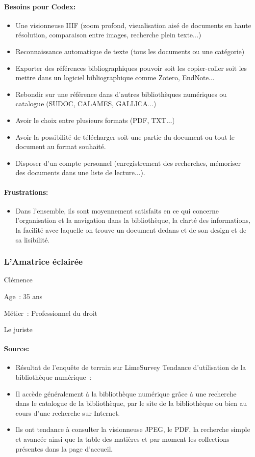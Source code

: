 \paragraph*{Besoins pour Codex:}
\begin{itemize}
	\item Une visionneuse IIIF (zoom profond, visualisation aisé de documents en haute résolution, comparaison entre images, recherche plein texte...)
\item Reconnaissance automatique de texte (tous les documents ou une catégorie)
\item Exporter des références bibliographiques pouvoir soit les copier-coller soit les mettre dans un logiciel bibliographique comme Zotero, EndNote...
\item Rebondir sur une référence dans d'autres bibliothèques numériques ou catalogue (SUDOC, CALAMES, GALLICA...)
\item Avoir le choix entre plusieurs formats (PDF, TXT...)
\item Avoir la possibilité de télécharger soit une partie du document ou tout le document au format souhaité.
\item Disposer d'un compte personnel (enregistrement des recherches, mémoriser des documents dans une liste de lecture...).
\end{itemize}
\paragraph*{Frustrations:}
\begin{itemize}
	\item Dans l’ensemble, ils sont moyennement satisfaits en ce qui concerne l’organisation et la navigation dans la bibliothèque, la clarté des informations, la facilité avec laquelle on trouve un document dedans et de son design et de sa lisibilité.
\end{itemize}

\subsubsection*{L’Amatrice éclairée}
Clémence 

Age : 35 ans

Métier : Professionnel du droit

Le juriste

\paragraph*{Source:}
\begin{itemize}
	\item Résultat de l’enquête de terrain sur LimeSurvey
Tendance d’utilisation de la bibliothèque numérique :
\item Il accède généralement à la bibliothèque numérique grâce à une recherche dans le catalogue de la bibliothèque, par le site de la bibliothèque ou bien au cours d’une recherche sur Internet.
\item Ils ont tendance à consulter la visionneuse JPEG, le PDF, la recherche simple et avancée ainsi que la table des matières et par moment les collections présentes dans la page d’accueil.
\end{itemize}
